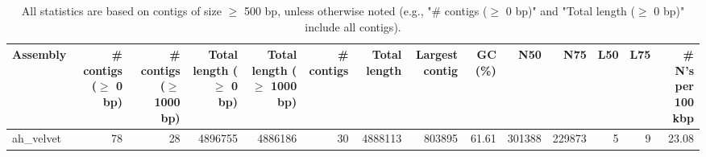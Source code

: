 \documentclass[12pt,a4paper]{article}
\begin{document}
\begin{table}[ht]
\begin{center}
\caption{All statistics are based on contigs of size $\geq$ 500 bp, unless otherwise noted (e.g., "\# contigs ($\geq$ 0 bp)" and "Total length ($\geq$ 0 bp)" include all contigs).}
\begin{tabular}{|l*{13}{|r}|}
\hline
Assembly & \# contigs ($\geq$ 0 bp) & \# contigs ($\geq$ 1000 bp) & Total length ($\geq$ 0 bp) & Total length ($\geq$ 1000 bp) & \# contigs & Total length & Largest contig & GC (\%) & N50 & N75 & L50 & L75 & \# N's per 100 kbp \\ \hline
ah\_velvet & 78 & 28 & 4896755 & 4886186 & 30 & 4888113 & 803895 & 61.61 & 301388 & 229873 & 5 & 9 & 23.08 \\ \hline
\end{tabular}
\end{center}
\end{table}
\end{document}
